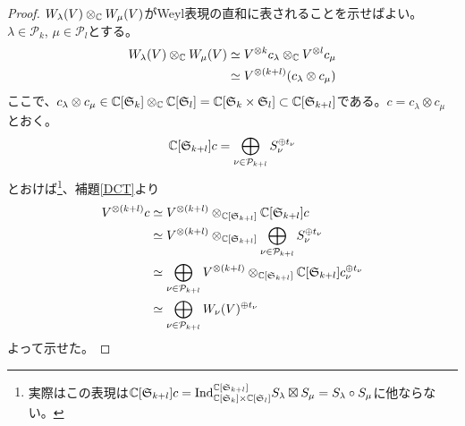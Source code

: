 \documentclass{ltjsreport}
\begin{document}
\begin{proof}
  $W_\lambda(V)\otimes_{\mathbb{C}}W_\mu(V)$がWeyl表現の直和に表されることを示せばよい。$\lambda\in\mathcal{P}_k$, $\mu\in\mathcal{P}_l$とする。
  \begin{align*}
    W_\lambda(V)\otimes_{\mathbb{C}} W_\mu(V)
    &\simeq V^{\otimes k}c_\lambda\otimes_{\mathbb{C}}V^{\otimes l}c_\mu\\
    &\simeq V^{\otimes (k+l)}(c_\lambda\otimes c_\mu)
  \end{align*}
  ここで、$c_\lambda\otimes c_\mu\in\mathbb{C}[\mathfrak{S}_k]\otimes_{\mathbb{C}}\mathbb{C}[\mathfrak{S}_l]=\mathbb{C}[\mathfrak{S}_{k}\times\mathfrak{S}_l]\subset\mathbb{C}[\mathfrak{S}_{k+l}]$である。$c=c_\lambda\otimes c_\mu$とおく。
  \[
  \mathbb{C}[\mathfrak{S}_{k+l}]c=\bigoplus_{\nu\in\mathcal{P}_{k+l}}S_\nu^{\oplus t_\nu}
  \]
  とおけば\footnote{
    実際はこの表現は$\mathbb{C}[\mathfrak{S}_{k+l}]c=\text{Ind}_{\mathbb{C}[\mathfrak{S}_k]\times\mathbb{C}[\mathfrak{S}_l]}^{\mathbb{C}[\mathfrak{S}_{k+l}]}S_\lambda\boxtimes S_\mu=S_\lambda\circ S_\mu$に他ならない。
  }、補題\ref{DCT}より
  \begin{align*}
    V^{\otimes (k+l)}c
    &\simeq V^{\otimes (k+l)}\otimes_{\mathbb{C}[\mathfrak{S}_{k+l}]}\mathbb{C}[\mathfrak{S}_{k+l}]c\\
    &\simeq V^{\otimes (k+l)}\otimes_{\mathbb{C}[\mathfrak{S}_{k+l}]}\bigoplus_{\nu\in\mathcal{P}_{k+l}}S_\nu^{\oplus t_\nu}\\
    &\simeq \bigoplus_{\nu\in\mathcal{P}_{k+l}}V^{\otimes (k+l)}\otimes_{\mathbb{C}[\mathfrak{S}_{k+l}]}\mathbb{C}[\mathfrak{S}_{k+l}]c_\nu^{\oplus t_\nu}\\
    &\simeq \bigoplus_{\nu\in\mathcal{P}_{k+l}}W_\nu(V)^{\oplus t_\nu}\\
  \end{align*}
  よって示せた。
\end{proof}
\end{document}
